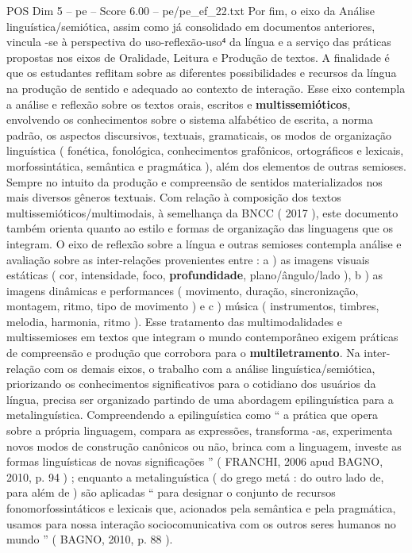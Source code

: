 \begin{textsample}{POS Dim 5 – pe – Score 6.00 – pe/pe\_ef\_22.txt}
Por fim, o eixo da Análise linguística/semiótica, assim como já consolidado em documentos anteriores, vincula -se à perspectiva do uso-reflexão-uso⁴ da língua e a serviço das práticas propostas nos eixos de Oralidade, Leitura e Produção de textos.
A finalidade é que os estudantes reflitam sobre as diferentes possibilidades e recursos da língua na produção de sentido e adequado ao contexto de interação.
Esse eixo contempla a análise e reflexão sobre os textos orais, escritos e \textbf{multissemióticos}, envolvendo os conhecimentos sobre o sistema alfabético de escrita, a norma padrão, os aspectos discursivos, textuais, gramaticais, os modos de organização linguística ( fonética, fonológica, conhecimentos grafônicos, ortográficos e lexicais, morfossintática, semântica e pragmática ), além dos elementos de outras semioses.
Sempre no intuito da produção e compreensão de sentidos materializados nos mais diversos gêneros textuais.
Com relação à composição dos textos multissemióticos/multimodais, à semelhança da BNCC ( 2017 ), este documento também orienta quanto ao estilo e formas de organização das linguagens que os integram.
O eixo de reflexão sobre a língua e outras semioses contempla análise e avaliação sobre as inter-relações provenientes entre : a ) as imagens visuais estáticas ( cor, intensidade, foco, \textbf{profundidade}, plano/ângulo/lado ), b ) as imagens dinâmicas e performances ( movimento, duração, sincronização, montagem, ritmo, tipo de movimento ) e c ) música ( instrumentos, timbres, melodia, harmonia, ritmo ).
Esse tratamento das multimodalidades e multissemioses em textos que integram o mundo contemporâneo exigem práticas de compreensão e produção que corrobora para o \textbf{multiletramento}.
Na inter-relação com os demais eixos, o trabalho com a análise linguística/semiótica, priorizando os conhecimentos significativos para o cotidiano dos usuários da língua, precisa ser organizado partindo de uma abordagem epilinguística para a metalinguística.
Compreendendo a epilinguística como “ a prática que opera sobre a própria linguagem, compara as expressões, transforma -as, experimenta novos modos de construção canônicos ou não, brinca com a linguagem, investe as formas linguísticas de novas significações ” ( FRANCHI, 2006 apud BAGNO, 2010, p. 94 ) ; enquanto a metalinguística ( do grego metá : do outro lado de, para além de ) são aplicadas “ para designar o conjunto de recursos fonomorfossintáticos e lexicais que, acionados pela semântica e pela pragmática, usamos para nossa interação sociocomunicativa com os outros seres humanos no mundo ” ( BAGNO, 2010, p. 88 ).

\end{textsample}
